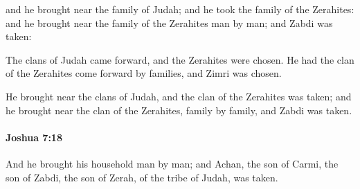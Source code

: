 			\begin{versebox}
					\item[BHS] 
					\item[ASV] and he brought near the family of Judah; and he took the family of the Zerahites: and he brought near the family of the Zerahites man by man; and Zabdi was taken:
					\item[NIV] The clans of Judah came forward, and the Zerahites were chosen. He had the clan of the Zerahites come forward by families, and Zimri was chosen.
					\item[NRSV] He brought near the clans of Judah, and the clan of the Zerahites was taken; and he brought near the clan of the Zerahites, family by family, and Zabdi was taken.
			\end{versebox}

		\paragraph{Joshua 7:18} %
			\label{JOSHUA-7-18}

			And he brought his household man by man; and Achan, the son of Carmi, the son of Zabdi, the son of Zerah, of the tribe of Judah, was taken.

